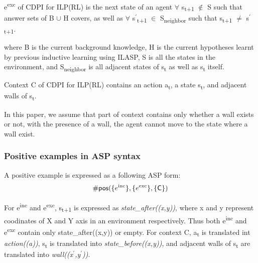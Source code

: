 \begin{defn} \label{def:ILPRL_exc}
e\textsuperscript{exc} of CDPI for ILP(RL) is the next state of an agent $\forall$ s\textsubscript{t+1} $\not\in$ S such that answer sets of B $\cup$ H covers,
as well as $\forall$ s$^\prime$\textsubscript{t+1} $\in$ S\textsubscript{neighbor} such that s\textsubscript{t+1} $\neq$ s$^\prime$\textsubscript{t+1}.
\end{defn}
where B is the current background knowledge, H is the current hypotheses learnt by previous inductive learning using ILASP, S is all the states in the environment, and S\textsubscript{neighbor} is all adjacent states of s\textsubscript{t} as well as s\textsubscript{t} itself.

\begin{defn}\label{def:ILPRL_context}
Context C of CDPI for ILP(RL) contains an action a\textsubscript{t}, a state s\textsubscript{t}, and adjacent walls of s\textsubscript{t}.
\label{def:context}
\end{defn}

In this paper, we assume that part of context contains only whether a wall exists or not, with the presence of a wall, the agent cannot move to the state where a wall exist.

\subsubsection{Positive examples in ASP syntax}
\label{subsubsec:positive_examples_asp_syntax}
A positive example is expressed as a following ASP form:
\begin{equation}
\begin{split}
    \textsf{\#pos}(\{e\textsuperscript{inc}\}, \{e\textsuperscript{exc}\}, \textsf{\{C\}})
\end{split}
\end{equation}

For e\textsuperscript{inc} and e\textsuperscript{exc}, s\textsubscript{t+1} is expressed as \textit{state\_after((x,y))}, where x and y represent coodinates of X and Y axis in an environment respectively.
Thus both e\textsuperscript{inc} and e\textsuperscript{exc} contain only state\_after((x,y)) or empty.
For context C, a\textsubscript{t} is translated int \textit{action((a))}, s\textsubscript{t} is translated into \textit{state\_before((x,y))}, and adjacent walls of s\textsubscript{t} are translated into \textit{wall((x$^\prime$,y$^\prime$))}.


